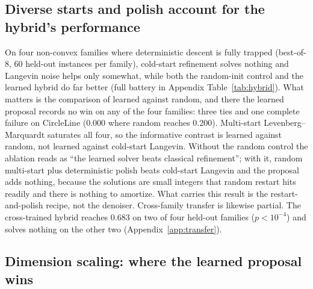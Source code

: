 \documentclass[letterpaper]{article} %
\begin{document}
\subsection{Diverse starts and polish account for the hybrid's performance}
\label{sec:hybrid}

On four non-convex families where deterministic descent is fully trapped (best-of-8, 60
held-out instances per family), cold-start refinement solves nothing and Langevin noise helps
only somewhat, while both the random-init control and the learned hybrid do far better (full
battery in Appendix Table~\ref{tab:hybrid}). What matters is the comparison of learned
against random, and there the learned proposal records no win on any of the four families:
three ties and one complete failure on CircleLine (0.000 where random reaches 0.200).
Multi-start Levenberg--Marquardt saturates all four, so the informative contrast is learned
against random, not learned against cold-start Langevin.
Without the random control the ablation reads as ``the
learned solver beats classical refinement''; with it, random multi-start plus deterministic
polish beats cold-start Langevin and the proposal adds nothing, because the solutions are
small integers that random restart hits readily and there is nothing to
amortize. What carries this result is the restart-and-polish recipe, not the denoiser. Cross-family transfer is likewise
partial. The cross-trained hybrid reaches 0.683 on two of four held-out families
($p < 10^{-4}$) and solves nothing on the other two
(Appendix~\ref{app:transfer}).

\subsection{Dimension scaling: where the learned proposal wins}
\label{sec:scaling}
\end{document}
